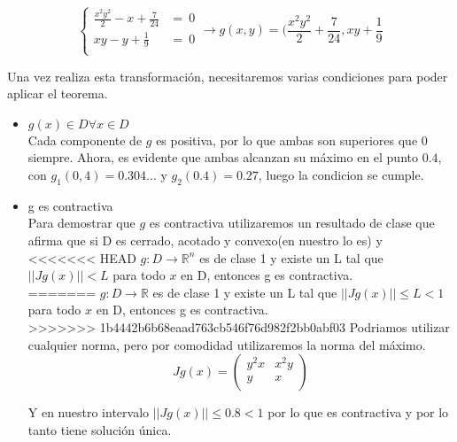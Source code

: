 \documentclass[11pt]{article}
\begin{document}
$$\begin{cases}
\frac{x^2y^2}{2} - x + \frac{7}{24} &= \ 0 \\
xy - y + \frac{1}{9} &= \ 0\\
\end{cases} \longrightarrow g(x,y) = (\frac{x^2y^2}{2} + \frac{7}{24}, xy +
\frac{1}{9} $$

Una vez realiza esta transformación, necesitaremos varias condiciones para poder
aplicar el teorema.
\begin{itemize}
        \item $g(x) \in D \forall x \in D$\\
        Cada componente de $g$ es positiva, por lo que ambas son superiores que
        $0$ siempre. Ahora, es evidente que ambas alcanzan su máximo en el punto
        $0.4$, con $g_1(0,4) = 0.304...$ y $g_2(0.4) = 0.27$, luego la condicion
        se cumple.
        \item g es contractiva\\
        Para demostrar que $g$ es contractiva utilizaremos un resultado de clase
        que afirma que si D es cerrado, acotado y convexo(en nuestro lo es) y
<<<<<<< HEAD
        $g:D \rightarrow  \mathbb{R}^n $ es de clase 1 y existe un L tal que
        $||Jg(x)|| < L$ para todo $x$ en D, entonces g es contractiva.\\
=======
        $g:D \rightarrow \mathds{R}$ es de clase 1 y existe un L tal que
        $||Jg(x)|| \leq L < 1$ para todo $x$ en D, entonces g es contractiva.\\
>>>>>>> 1b4442b6b68eaad763cb546f76d982f2bb0abf03
        Podriamos utilizar cualquier norma, pero por comodidad utilizaremos la
        norma del máximo.
        $$Jg(x) =\begin{pmatrix}
 y^2x & x^2y    \\
 y    & x       \\
\end{pmatrix}        $$

Y en nuestro intervalo $||Jg(x)|| \leq 0.8 <1$ por lo que es contractiva y por lo tanto tiene solución única.
\end{itemize}
\end{document}
